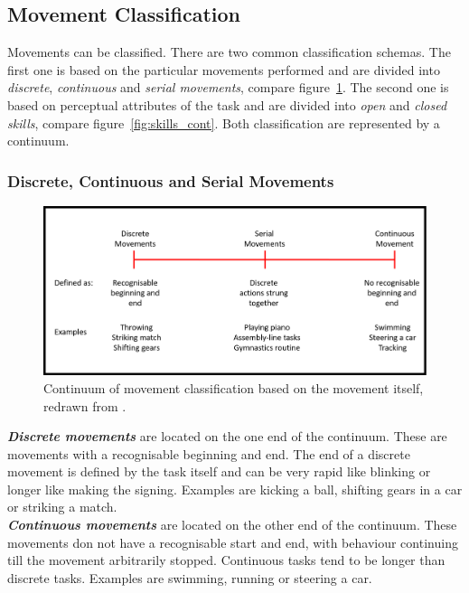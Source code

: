 
\subsection{Movement Classification}
Movements can be classified. There are two common classification schemas. The first one is based on the particular movements performed and are divided into \textit{discrete}, \textit{continuous} and \textit{serial movements}, compare figure~\ref{fig:movements_cont}. The second one is based on perceptual attributes of the task and are divided into \textit{open} and \textit{closed skills}, compare figure~\ref{fig:skills_cont}. Both classification are represented by a continuum.

\subsubsection{Discrete, Continuous and Serial Movements}
\begin{figure}
	\centering
	\includegraphics[width=1.0\textwidth]{img/movement_classification.png}
	\caption{Continuum of movement classification based on the movement itself, redrawn from \cite{Schmidt2011}.}
	\label{fig:movements_cont}
\end{figure}
\textit{\textbf{Discrete movements}} are located on the one end of the continuum. These are movements with a recognisable beginning and end. The end of a discrete movement is defined by the task itself and can be very rapid like blinking or longer like making the signing. Examples are kicking a ball, shifting gears in a car or striking a match.\\
\textit{\textbf{Continuous movements}} are located on the other end of the continuum. These movements don not have a recognisable start and end, with behaviour continuing till the movement arbitrarily stopped. Continuous tasks tend to be longer than discrete tasks. Examples are swimming, running or steering a car.\\
